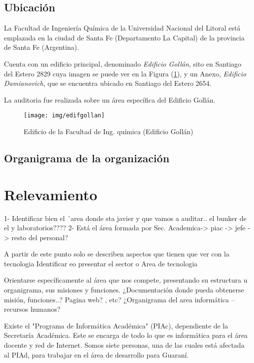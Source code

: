 \documentclass[10pt,a4paper,final]{article}
\begin{document}
\subsection{Ubicación}
La Facultad de Ingeniería Química de la Universidad Nacional del Litoral está emplazada en la ciudad de Santa Fe (Departamento La Capital) de la provincia de Santa Fe (Argentina). 

Cuenta con un edificio principal, denominado \emph{Edificio Gollán}, sito en Santiago del Estero 2829 cuya imagen se puede ver en la Figura (\ref{edif_gollan}), y un Anexo, \emph{Edificio Damianovich}, que se encuentra ubicado en Santiago del Estero 2654.

La auditoria fue realizada sobre un área específica del Edificio Gollán.
\begin{figure}[tbhp]
\centerline{\texttt{[image: img/edifgollan]}}
\caption{Edificio de la Facultad de Ing. química (Edificio Gollán)}
\label{edif_gollan}
\end{figure}

\subsection{Organigrama de la organización}

\section{Relevamiento}
1- Identificar bien el ´area donde sta javier y que vamos a auditar.. el bunker de el y laboratorios????
2- Está el área formada por Sec. Academica-> piac -> jefe -> resto del personal?

A partir de este punto solo se describen aspectos que tienen que ver con la tecnologia
Identificar eo presentar el sector o Area de tecnologia

Orientarse específicamente al área que nos compete, presentando su estructura u organigrama, sus misiones y funciones.
¿Documentación donde pueda obtenerse misión, funciones..? Pagina web? , etc?
¿Organigrama del area informática – recursos humanos?

Existe el "Programa de Informática Académica" (PIAc), dependiente de la Secretaría Académica. Este se encarga de todo lo que es informática para el área docente y red de Internet. Somos siete personas, una de las cuales está afectada al PIAd, para trabajar en el área de desarrollo para Guaraní.
\end{document}
